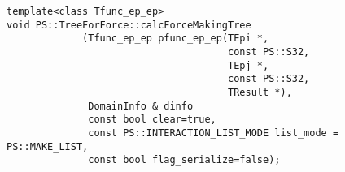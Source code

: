 
\begin{screen}
\begin{verbatim}
template<class Tfunc_ep_ep>
void PS::TreeForForce::calcForceMakingTree
             (Tfunc_ep_ep pfunc_ep_ep(TEpi *,
                                      const PS::S32,
                                      TEpj *,
                                      const PS::S32,
                                      TResult *),
              DomainInfo & dinfo
              const bool clear=true,
              const PS::INTERACTION_LIST_MODE list_mode = PS::MAKE_LIST,
              const bool flag_serialize=false);
\end{verbatim}
\end{screen}

